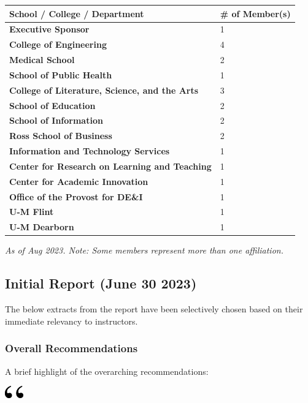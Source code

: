 \documentclass[
]{book}
\begin{document}
\begin{longtable}[]{@{}ll@{}}
\toprule\noalign{}
School / College / Department & \# of Member(s) \\
\midrule\noalign{}
\endhead
\bottomrule\noalign{}
\endlastfoot
\textbf{Executive Sponsor} & 1 \\
\textbf{College of Engineering} & 4 \\
\textbf{Medical School} & 2 \\
\textbf{School of Public Health} & 1 \\
\textbf{College of Literature, Science, and the Arts} & 3 \\
\textbf{School of Education} & 2 \\
\textbf{School of Information} & 2 \\
\textbf{Ross School of Business} & 2 \\
\textbf{Information and Technology Services} & 1 \\
\textbf{Center for Research on Learning and Teaching} & 1 \\
\textbf{Center for Academic Innovation} & 1 \\
\textbf{Office of the Provost for DE\&I} & 1 \\
\textbf{U-M Flint} & 1 \\
\textbf{U-M Dearborn} & 1 \\
\end{longtable}

\emph{As of Aug 2023. Note: Some members represent more than one affiliation.}

\hypertarget{initial-report-june-30-2023}{%
\subsection{Initial Report (June 30 2023)}\label{initial-report-june-30-2023}}

The below extracts from the report have been selectively chosen based on their immediate relevancy to instructors.

\hypertarget{overall-recommendations}{%
\subsubsection*{Overall Recommendations}\label{overall-recommendations}}

A brief highlight of the overarching recommendations:

\includegraphics[width=0.3125in,height=0.20833in]{open.png}
\end{document}
